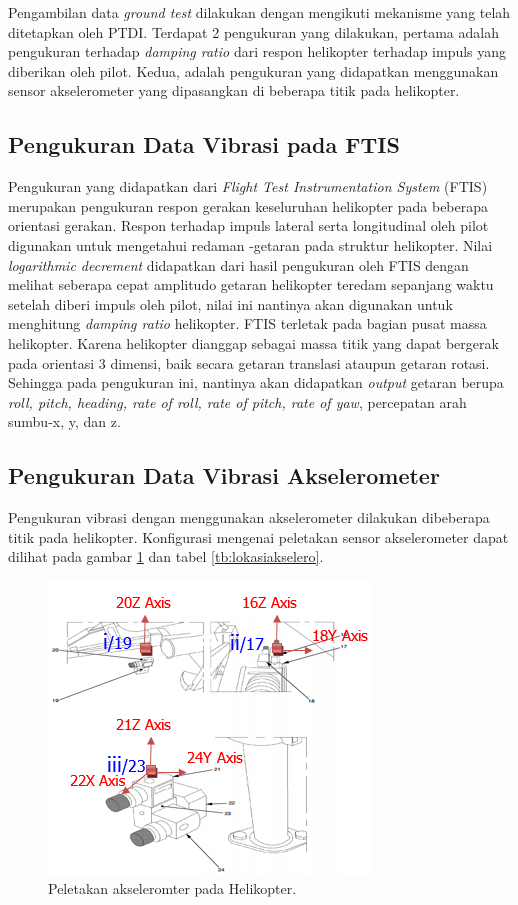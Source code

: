 Pengambilan data \textit{ground test} dilakukan dengan mengikuti mekanisme yang telah ditetapkan oleh PTDI. Terdapat 2 pengukuran yang dilakukan, pertama adalah pengukuran terhadap \textit{damping ratio} dari respon helikopter terhadap impuls yang diberikan oleh pilot. Kedua, adalah pengukuran yang didapatkan menggunakan sensor akselerometer yang dipasangkan di beberapa titik pada helikopter.

\subsection{Pengukuran Data Vibrasi pada FTIS}
Pengukuran yang didapatkan dari \textit{Flight Test Instrumentation System} (FTIS) merupakan pengukuran respon gerakan keseluruhan helikopter pada beberapa orientasi gerakan. Respon terhadap impuls lateral serta longitudinal oleh pilot digunakan untuk mengetahui redaman \hyp{}getaran pada struktur helikopter. Nilai \textit{logarithmic decrement} didapatkan dari hasil pengukuran oleh FTIS dengan melihat seberapa cepat amplitudo getaran helikopter teredam sepanjang waktu setelah diberi impuls oleh pilot, nilai ini nantinya akan digunakan untuk menghitung \textit{damping ratio} helikopter. FTIS terletak pada bagian pusat massa helikopter. Karena helikopter dianggap sebagai massa titik yang dapat bergerak pada orientasi 3 dimensi, baik secara getaran translasi ataupun getaran rotasi. Sehingga pada pengukuran ini, nantinya akan didapatkan \textit{output} getaran berupa \textit{roll, pitch, heading, rate of roll, rate of pitch, rate of yaw}, percepatan arah sumbu-x, y, dan z.

\subsection{Pengukuran Data Vibrasi Akselerometer}
\label{Pengukuran Data Vibrasi Akselerometer}

Pengukuran vibrasi dengan menggunakan akselerometer dilakukan dibeberapa titik pada helikopter. Konfigurasi mengenai peletakan sensor akselerometer dapat dilihat pada gambar \ref{peletakan_sensor.png} dan tabel \ref{tb:lokasiakselero}.

\begin{figure}[H]
	\centering
	\includegraphics[width=0.6\linewidth]{gambar/peletakan_sensor.png}
	\caption{Peletakan akseleromter pada Helikopter.}
	\label{peletakan_sensor.png}
\end{figure}

